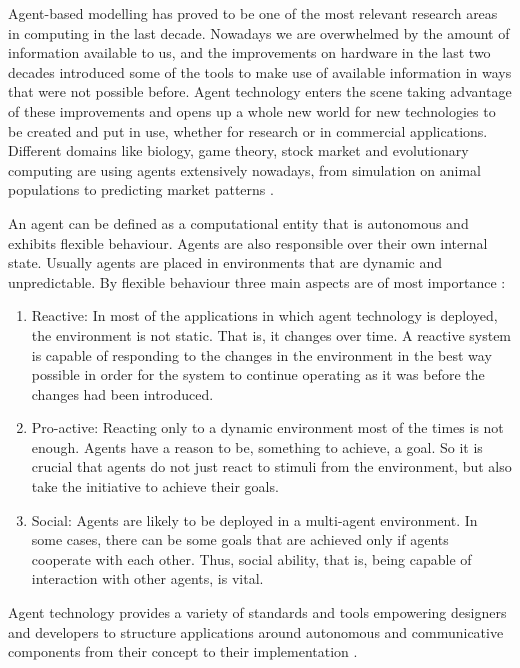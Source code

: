 Agent-based modelling has proved to be one of the most relevant research areas in computing in the last decade. Nowadays we are overwhelmed by the amount of information available to us, and the improvements on hardware in the last two decades introduced some of the tools to make use of available information in ways that were not possible before. Agent technology enters the scene taking advantage of these improvements and opens up a whole new world for new technologies to be created and put in use, whether for research or in  commercial applications. Different domains like biology, game theory, stock market and evolutionary computing are using agents extensively nowadays, from simulation on animal populations \cite{Caplat2008491} to predicting market patterns \cite{andreoni1995}.

An agent can be defined as a computational entity that is autonomous and exhibits flexible behaviour. Agents are also responsible over their own internal state. Usually agents are placed in environments that are dynamic and unpredictable. By flexible behaviour three main aspects are of most importance \cite{wooldridge2009introduction}:

\begin{enumerate}
\item Reactive: In most of the applications in which agent technology is deployed, the environment is not static. That is, it changes over time. A reactive system is capable of responding to the changes in the environment in the best way possible in order for the system to continue operating as it was before the changes had been introduced. 

\item Pro-active: Reacting only to a dynamic environment most of the times is not enough. Agents have a reason to be, something to achieve, a goal. So it is crucial that agents do not just react to stimuli from the environment, but also take the initiative to achieve their goals.

\item Social: Agents are likely to be deployed in a multi-agent environment. In some cases, there can be some goals that are achieved only if agents cooperate with each other. Thus, social ability, that is, being capable of interaction with other agents, is vital.
\end{enumerate}

Agent technology provides a variety of standards and tools empowering designers and developers to structure applications around autonomous and communicative components from their concept to their implementation \cite{al3roadmap}.


